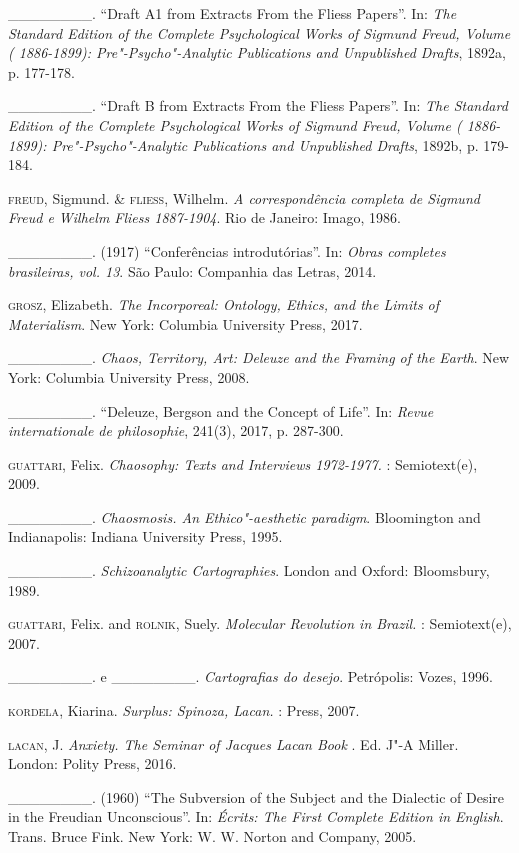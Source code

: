 \begin{Parskip}
\_\_\_\_\_\_\_\_. ``Draft A1 from Extracts From the Fliess Papers''. In:
\emph{The Standard Edition of the Complete Psychological Works of
Sigmund Freud, Volume  ( 1886-1899): Pre"-Psycho"-Analytic Publications
and Unpublished Drafts}, 1892a, p. 177-178.

\_\_\_\_\_\_\_\_. ``Draft B from Extracts From the Fliess Papers''. In:
\emph{The Standard Edition of the Complete Psychological Works of
Sigmund Freud, Volume  ( 1886-1899): Pre"-Psycho"-Analytic Publications
and Unpublished Drafts}, 1892b, p. 179-184.

\textsc{freud}, Sigmund. \& \textsc{fliess}, Wilhelm. \emph{A correspondência completa de Sigmund
Freud e Wilhelm Fliess 1887-1904}. Rio de Janeiro: Imago, 1986.

\_\_\_\_\_\_\_\_. (1917) ``Conferências introdutórias''. In: \emph{Obras
completes brasileiras, vol. 13}. São Paulo: Companhia das Letras, 2014.

\textsc{grosz}, Elizabeth. \emph{The Incorporeal: Ontology, Ethics, and the Limits
of Materialism}. New York: Columbia University Press, 2017.

\_\_\_\_\_\_\_\_. \emph{Chaos, Territory, Art: Deleuze and the Framing of
the Earth}. New York: Columbia University Press, 2008.

\_\_\_\_\_\_\_\_. ``Deleuze, Bergson and the Concept of Life''. In: \emph{Revue
internationale de philosophie}, 241(3), 2017, p. 287-300.

\textsc{guattari}, Felix. \emph{Chaosophy: Texts and Interviews 1972-1977.}
: Semiotext(e), 2009.

\_\_\_\_\_\_\_\_. \emph{Chaosmosis. An Ethico"-aesthetic paradigm}.
Bloomington and Indianapolis: Indiana University Press, 1995.

\_\_\_\_\_\_\_\_. \emph{Schizoanalytic Cartographies}. London and Oxford: Bloomsbury, 1989.

\textsc{guattari}, Felix. and \textsc{rolnik}, Suely. \emph{Molecular Revolution in
Brazil.} : Semiotext(e), 2007.

\_\_\_\_\_\_\_\_. e \_\_\_\_\_\_\_\_. \emph{Cartografias do desejo}. Petrópolis:
Vozes, 1996.

\textsc{kordela}, Kiarina. \emph{Surplus: Spinoza, Lacan.} :  Press, 2007.

\textsc{lacan}, J. \emph{Anxiety. The Seminar of Jacques Lacan Book }. Ed.
J"-A Miller. London: Polity Press, 2016.

\_\_\_\_\_\_\_\_. (1960) ``The Subversion of the Subject and the Dialectic of
Desire in the Freudian Unconscious''. In: \emph{Écrits: The First Complete
Edition in English}. Trans. Bruce Fink. New York: W. W. Norton and Company, 2005.


\end{Parskip}
